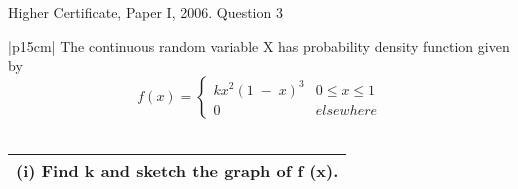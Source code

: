 \documentclass[a4paper,30pt]{article}
\begin{document}
Higher Certificate, Paper I, 2006. Question 3
\begin{table}[ht!]
     \centering
     \begin{tabular}{|p{15cm}|}
     \hline        
\noindent  The continuous random variable X has probability density function given by
\[ f(x) = \begin{cases}  kx^2(1\;-\;x)^3  & 0 \leq x \leq 1\\
0 &  elsewhere
\end{cases}
\]
\\ \hline
      \end{tabular}
    \end{table}

\begin{table}[ht!]
     \centering
     \begin{tabular}{|p{15cm}|}
     \hline        
\noindent (i) Find k and sketch the graph of f (x).


\\ \hline
      \end{tabular}
    \end{table}
    
\end{document}
